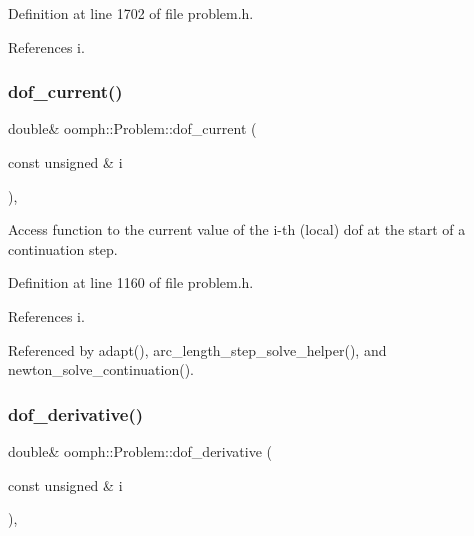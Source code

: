 Definition at line 1702 of file problem.\+h.



References i.

\mbox{\label{classoomph_1_1Problem_a10fd6457ceceb02a0e11d860ac0017c5}} 
\subsubsection{\texorpdfstring{dof\+\_\+current()}{dof\_current()}}
{\footnotesize\ttfamily double\& oomph\+::\+Problem\+::dof\+\_\+current (\begin{DoxyParamCaption}\item[{const unsigned \&}]{i }\end{DoxyParamCaption})\hspace{0.3cm}{\ttfamily [inline]}, {\ttfamily [protected]}}



Access function to the current value of the i-\/th (local) dof at the start of a continuation step. 



Definition at line 1160 of file problem.\+h.



References i.



Referenced by adapt(), arc\+\_\+length\+\_\+step\+\_\+solve\+\_\+helper(), and newton\+\_\+solve\+\_\+continuation().

\mbox{\label{classoomph_1_1Problem_ad6df5fb0d282f25df1e94a665dd838e5}} 
\subsubsection{\texorpdfstring{dof\+\_\+derivative()}{dof\_derivative()}}
{\footnotesize\ttfamily double\& oomph\+::\+Problem\+::dof\+\_\+derivative (\begin{DoxyParamCaption}\item[{const unsigned \&}]{i }\end{DoxyParamCaption})\hspace{0.3cm}{\ttfamily [inline]}, {\ttfamily [protected]}}



